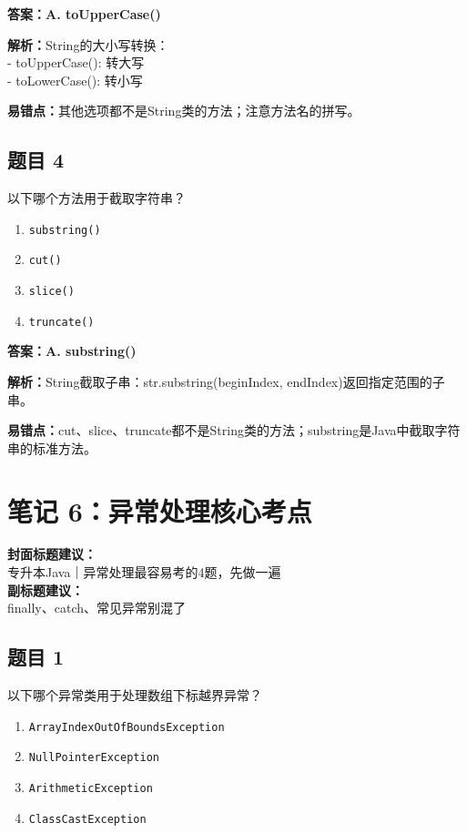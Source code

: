 \documentclass[12pt,a4paper]{ctexart}
\begin{document}
\begin{answerbox}
	\textbf{答案：A. toUpperCase()}

	\textbf{解析：}String的大小写转换：\\
	- toUpperCase(): 转大写\\
	- toLowerCase(): 转小写

	\textbf{易错点：}其他选项都不是String类的方法；注意方法名的拼写。
\end{answerbox}

\subsection*{题目 4}
以下哪个方法用于截取字符串？
\begin{enumerate}[label=\Alph*.]
	\item \texttt{substring()}
	\item \texttt{cut()}
	\item \texttt{slice()}
	\item \texttt{truncate()}
\end{enumerate}

\begin{answerbox}
	\textbf{答案：A. substring()}

	\textbf{解析：}String截取子串：str.substring(beginIndex, endIndex)返回指定范围的子串。

	\textbf{易错点：}cut、slice、truncate都不是String类的方法；substring是Java中截取字符串的标准方法。
\end{answerbox}

\newpage

\section{笔记 6：异常处理核心考点}
\begin{coverbox}
	\textbf{封面标题建议：}\\
	专升本Java｜异常处理最容易考的4题，先做一遍\\
	\textbf{副标题建议：}\\
	finally、catch、常见异常别混了
\end{coverbox}

\subsection*{题目 1}
以下哪个异常类用于处理数组下标越界异常？
\begin{enumerate}[label=\Alph*.]
	\item \texttt{ArrayIndexOutOfBoundsException}
	\item \texttt{NullPointerException}
	\item \texttt{ArithmeticException}
	\item \texttt{ClassCastException}
\end{enumerate}
\end{document}
